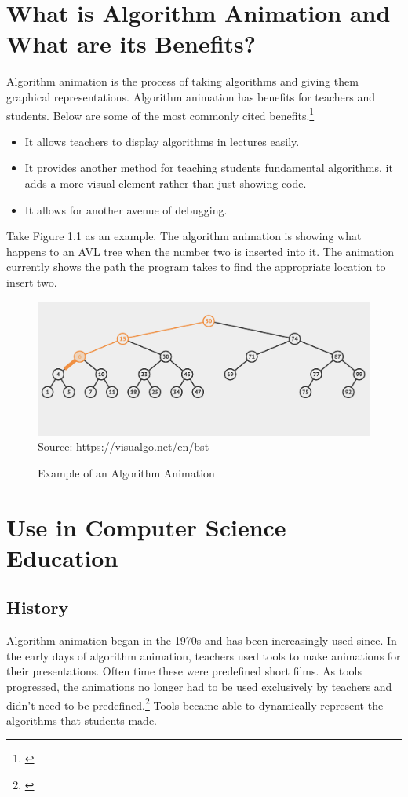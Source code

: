 \documentclass[12pt,twoside]{reedthesis}
\begin{document}
\section{What is Algorithm Animation and What are its Benefits?}	
Algorithm animation is the process of taking algorithms and giving them graphical representations. Algorithm animation has benefits for teachers and students. Below are some of the most commonly cited benefits.\footnote{\cite{hundhausen_meta-study_2002}}
\begin{itemize}
\item It allows teachers to display algorithms in lectures easily.
\item It provides another method for teaching students fundamental algorithms, it adds a more visual element rather than just showing code. 
\item It allows for another avenue of debugging. 
\end{itemize}
Take Figure 1.1 as an example. The algorithm animation is showing what happens to an AVL tree when the number two is inserted into it. The animation currently shows the path the program takes to find the appropriate location to insert two. 
\begin{figure}[htbp] 
\begin{centering} 
\caption{Example of an Algorithm Animation}
\includegraphics[scale=0.462] {animexample}
\footnotesize{Source: https://visualgo.net/en/bst}
\label{animexample}
\end{centering} 
\end{figure}


\section{Use in Computer Science Education}

\subsection{History}
Algorithm animation began in the 1970s and has been increasingly used since. In the early days of algorithm animation, teachers used tools to make animations for their presentations. Often time these were predefined short films. As tools progressed, the animations no longer had to be used exclusively by teachers and didn't need to be predefined.\footnote{\cite{hundhausen_meta-study_2002}} Tools became able to dynamically represent the algorithms that students made. 
\end{document}
